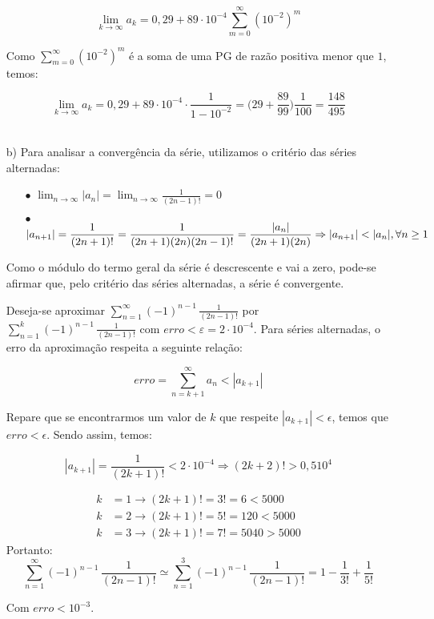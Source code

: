 \documentclass[12pt,a4paper]{article}
\begin{document}
\begin{itemize}
    $$ \lim_{k \rightarrow \infty} a_k = 0,29 + 89 \cdot 10^{-4} \sum_{m=0}^{\infty} (10^{-2})^m $$
    
    Como $\displaystyle\sum_{m=0}^{\infty} (10^{-2})^m$ é a soma de uma PG de razão positiva menor que $1$, temos:
    
    $$ \lim_{k \rightarrow \infty} a_k = 0,29 + 89 \cdot 10^{-4} \cdot \frac{1}{1 - 10^{-2}} = \Big(29 + \frac{89}{99} \Big) \frac{1}{100} = \frac{148}{495} $$ \\



    \item[b)] Para analisar a convergência da série, utilizamos o critério das séries alternadas:
    
    \begin{itemize}
    \item[$\bullet$] $\displaystyle\lim_{n \rightarrow \infty} |a_n| = \lim_{n \rightarrow \infty} \displaystyle\frac{1}{(2n-1)!} = 0 $
    \item[$\bullet$] $|a_{n+1}| = \displaystyle\frac{1}{(2n+1)!} = \displaystyle\frac{1}{(2n+1)(2n)(2n-1)!} = \frac{|a_n|}{(2n+1)(2n)} \\ \Rightarrow |a_{n+1}| < |a_n|, \forall n \geq 1  $
    \end{itemize}
    
    Como o módulo do termo geral da série é descrescente e vai a zero, pode-se afirmar que, pelo critério das séries alternadas, a série é convergente.
    
    Deseja-se aproximar $\displaystyle\sum_{n=1}^\infty (-1)^{n-1} \, \frac{1}{(2n-1)!}$ por $\displaystyle\sum_{n=1}^k (-1)^{n-1} \, \frac{1}{(2n-1)!}$  com $erro < \varepsilon = 2 \cdot 10^{-4}$.
Para séries alternadas, o erro da aproximação respeita a seguinte relação:

$$ erro = \sum_{n=k+1}^\infty a_n < |a_{k+1}| $$

Repare que se encontrarmos um valor de $k$ que respeite $|a_{k+1}| < \epsilon$, temos que $erro < \epsilon$. Sendo assim, temos:

$$|a_{k+1}| = \frac{1}{(2k+1)!} < 2 \cdot 10^{-4} \Rightarrow (2k+2)! > 0,5 10^{4} $$

\begin{align*} 
    k &= 1 \rightarrow (2k+1)! = 3! = 6 < 5000 \\ 
    k &= 2 \rightarrow (2k+1)! = 5! = 120 < 5000 \\ 
    k &= 3 \rightarrow (2k+1)! = 7! = 5040 > 5000
\end{align*}
Portanto: 
$$ \sum_{n=1}^\infty (-1)^{n-1} \, \frac{1}{(2n-1)!}  \simeq \sum_{n=1}^3 (-1)^{n-1} \, \frac{1}{(2n-1)!} = 1 - \frac{1}{3!} + \frac{1}{5!}  $$

Com $erro < 10^{-3}$.
\end{itemize}
\newpage
\end{document}
